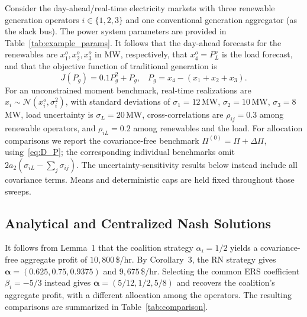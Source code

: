 \documentclass[journal]{IEEEtran}
\begin{document}
Consider the day-ahead/real-time electricity markets with three renewable generation operators $i \in \{1,2,3\}$ and one conventional generation aggregator (as the slack bus). The power system parameters are provided in Table~\ref{tab:example_params}. It follows that the day-ahead forecasts for the renewables are $x_1^o, x_2^o, x_3^o$ in MW, respectively, that $x_4^o = P_L^o$ is the load forecast, and that the objective function of traditional generation is 
\[
J(P_g) = 0.1P_g^2 + P_g, \;\;\; P_g=x_4-(x_1+x_2+x_3). 
\]
For an unconstrained moment benchmark, real-time realizations are $x_i \sim \mathcal{N}(x_i^o,\sigma_i^2)$, with standard deviations of $\sigma_1 = 12$\,MW, $\sigma_2 = 10$\,MW, $\sigma_3 = 8$\,MW, load uncertainty is $\sigma_L = 20$\,MW, cross-correlations are $\rho_{ij}=0.3$ among renewable operators, and $\rho_{iL}=0.2$ among renewables and the load. For allocation comparisons we report the covariance-free benchmark $\Pi^{(0)}=\Pi+\Delta\Pi$, using~\eqref{eq:D_P}; the corresponding individual benchmarks omit $2a_2(\sigma_{iL}-\sum_j\sigma_{ij})$. The uncertainty-sensitivity results below instead include all covariance terms. Means and deterministic caps are held fixed throughout those sweeps.



\subsection{Analytical and Centralized Nash Solutions}

It follows from Lemma~1 that the coalition strategy $\alpha_i=1/2$ yields a covariance-free aggregate profit of $10{,}800$\,\$/hr. By Corollary~3, the RN strategy gives $\boldsymbol\alpha=(0.625,0.75,0.9375)$ and $9{,}675$\,\$/hr. Selecting the common ERS coefficient $\beta_i=-5/3$ instead gives $\boldsymbol\alpha=(5/12,1/2,5/8)$ and recovers the coalition's aggregate profit, with a different allocation among the operators. The resulting comparisons are summarized in Table~\ref{tab:comparison}.

\begin{table}[hbt!]
\centering
\caption{Bidding Strategy Performance: Scenario 1 \\($n=3$, $x^o=(120,100,80)$\,MW, with ERS yielding no overbidding)}
\label{tab:comparison}
\end{table}
\end{document}
